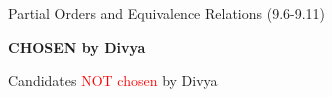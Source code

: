 \documentclass[handout]{mcs}
\begin{document}
\renewcommand{\reading}{Chapter~\bref{partial_order_sec}.\ \emph{Partial
    Orders} through~\bref{prop_summary_sec}.\ \emph{Relational Properties}}


\begin{staffnotes}
Partial Orders and Equivalence Relations (9.6-9.11)
\end{staffnotes}


\textbf{CHOSEN by Divya}


Candidates \textcolor{red}{NOT chosen} by Divya


\end{document}
